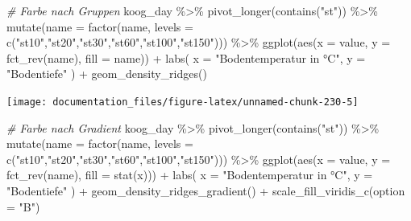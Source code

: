 \documentclass[
]{article}
\newenvironment{Shaded}{\begin{snugshade}}{\end{snugshade}}
\newcommand{\AttributeTok}[1]{\textcolor[rgb]{0.77,0.63,0.00}{#1}}
\newcommand{\CommentTok}[1]{\textcolor[rgb]{0.56,0.35,0.01}{\textit{#1}}}
\newcommand{\FunctionTok}[1]{\textcolor[rgb]{0.00,0.00,0.00}{#1}}
\newcommand{\NormalTok}[1]{#1}
\newcommand{\SpecialCharTok}[1]{\textcolor[rgb]{0.00,0.00,0.00}{#1}}
\newcommand{\StringTok}[1]{\textcolor[rgb]{0.31,0.60,0.02}{#1}}
\begin{document}
\begin{Shaded}
\begin{Highlighting}[]
\CommentTok{\# Farbe nach Gruppen}
\NormalTok{koog\_day }\SpecialCharTok{\%\textgreater{}\%}
  \FunctionTok{pivot\_longer}\NormalTok{(}\FunctionTok{contains}\NormalTok{(}\StringTok{"st"}\NormalTok{)) }\SpecialCharTok{\%\textgreater{}\%}
  \FunctionTok{mutate}\NormalTok{(}\AttributeTok{name =} \FunctionTok{factor}\NormalTok{(name, }\AttributeTok{levels =} \FunctionTok{c}\NormalTok{(}\StringTok{"st10"}\NormalTok{,}\StringTok{"st20"}\NormalTok{,}\StringTok{"st30"}\NormalTok{,}\StringTok{"st60"}\NormalTok{,}\StringTok{"st100"}\NormalTok{,}\StringTok{"st150"}\NormalTok{))) }\SpecialCharTok{\%\textgreater{}\%}
  \FunctionTok{ggplot}\NormalTok{(}\FunctionTok{aes}\NormalTok{(}\AttributeTok{x =}\NormalTok{ value, }\AttributeTok{y =} \FunctionTok{fct\_rev}\NormalTok{(name), }\AttributeTok{fill =}\NormalTok{ name)) }\SpecialCharTok{+}
  \FunctionTok{labs}\NormalTok{(}
    \AttributeTok{x =} \StringTok{"Bodentemperatur in °C"}\NormalTok{, }
    \AttributeTok{y =} \StringTok{"Bodentiefe"}
\NormalTok{  ) }\SpecialCharTok{+}
  \FunctionTok{geom\_density\_ridges}\NormalTok{()}
\end{Highlighting}
\end{Shaded}

\begin{center}\texttt{[image: documentation\_files/figure-latex/unnamed-chunk-230-5]} \end{center}

\begin{Shaded}
\begin{Highlighting}[]
\CommentTok{\# Farbe nach Gradient}
\NormalTok{koog\_day }\SpecialCharTok{\%\textgreater{}\%}
  \FunctionTok{pivot\_longer}\NormalTok{(}\FunctionTok{contains}\NormalTok{(}\StringTok{"st"}\NormalTok{)) }\SpecialCharTok{\%\textgreater{}\%}
  \FunctionTok{mutate}\NormalTok{(}\AttributeTok{name =} \FunctionTok{factor}\NormalTok{(name, }\AttributeTok{levels =} \FunctionTok{c}\NormalTok{(}\StringTok{"st10"}\NormalTok{,}\StringTok{"st20"}\NormalTok{,}\StringTok{"st30"}\NormalTok{,}\StringTok{"st60"}\NormalTok{,}\StringTok{"st100"}\NormalTok{,}\StringTok{"st150"}\NormalTok{))) }\SpecialCharTok{\%\textgreater{}\%}
  \FunctionTok{ggplot}\NormalTok{(}\FunctionTok{aes}\NormalTok{(}\AttributeTok{x =}\NormalTok{ value, }\AttributeTok{y =} \FunctionTok{fct\_rev}\NormalTok{(name), }\AttributeTok{fill =} \FunctionTok{stat}\NormalTok{(x))) }\SpecialCharTok{+}
  \FunctionTok{labs}\NormalTok{(}
    \AttributeTok{x =} \StringTok{"Bodentemperatur in °C"}\NormalTok{, }
    \AttributeTok{y =} \StringTok{"Bodentiefe"}
\NormalTok{  ) }\SpecialCharTok{+}
  \FunctionTok{geom\_density\_ridges\_gradient}\NormalTok{() }\SpecialCharTok{+}
  \FunctionTok{scale\_fill\_viridis\_c}\NormalTok{(}\AttributeTok{option =} \StringTok{"B"}\NormalTok{)}
\end{Highlighting}
\end{Shaded}
\end{document}

